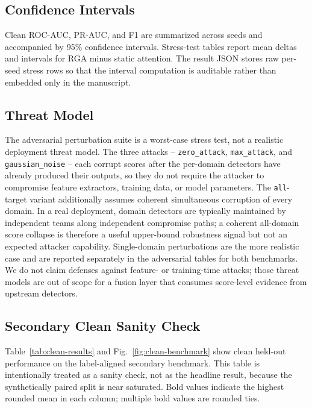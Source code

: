 \documentclass[10pt,conference]{IEEEtran}
\newcommand{\method}{RGA}
\newcommand{\benchmark}{ELARA-Bench-LA}
\begin{document}
\subsection{Confidence Intervals}
Clean ROC-AUC, PR-AUC, and F1 are summarized across seeds and accompanied by
95\% confidence intervals. Stress-test tables report mean deltas and intervals
for \method{} minus static attention. The result JSON stores raw per-seed
stress rows so that the interval computation is auditable rather than embedded
only in the manuscript.

\subsection{Threat Model}
\label{sec:threat-model}
The adversarial perturbation suite is a worst-case stress test, not a
realistic deployment threat model. The three attacks --
\texttt{zero\_attack}, \texttt{max\_attack}, and \texttt{gaussian\_noise} --
each corrupt scores after the per-domain detectors have already produced
their outputs, so they do not require the attacker to compromise feature
extractors, training data, or model parameters. The \texttt{all}-target
variant additionally assumes coherent simultaneous corruption of every
domain. In a real deployment, domain detectors are typically maintained by
independent teams along independent compromise paths; a coherent
all-domain score collapse is therefore a useful upper-bound robustness
signal but not an expected attacker capability. Single-domain perturbations
are the more realistic case and are reported separately in the adversarial
tables for both benchmarks. We do not claim defenses against feature- or
training-time attacks; those threat models are out of scope for a fusion
layer that consumes score-level evidence from upstream detectors.

\subsection{Secondary Clean Sanity Check}
\label{sec:la-clean}
Table~\ref{tab:clean-results} and Fig.~\ref{fig:clean-benchmark} show clean
held-out performance on the label-aligned secondary benchmark. This table is
intentionally treated as a sanity check, not as the headline result, because
the synthetically paired split is near saturated.
Bold values indicate the highest rounded mean in each column; multiple bold
values are rounded ties.

\begin{table}[t]
\centering
\caption{Saturated clean held-out performance on \benchmark. Values are
mean$\pm$standard deviation across five seeds; this table is not used as the
headline evidence.}
\label{tab:clean-results}
\footnotesize
\resizebox{\textwidth}{!}{}
\end{table}
\end{document}
